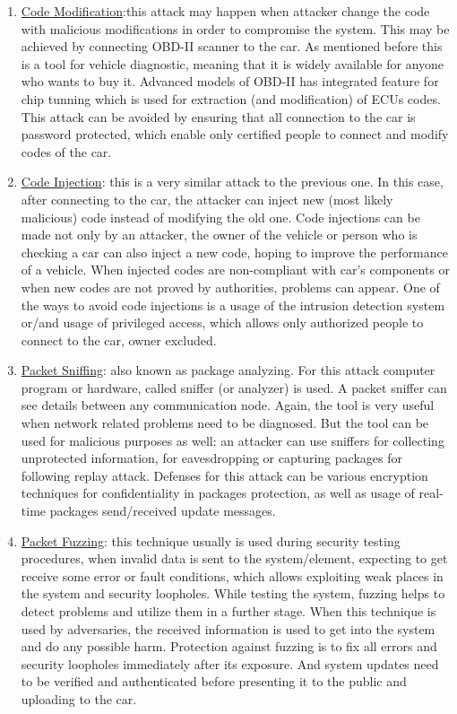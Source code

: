 \begin{itemize}
\begin{enumerate}
\begin{enumerate}
			\begin{enumerate}
				\item \underline{Code Modification}:this attack may happen when attacker change the code with malicious modifications in order to compromise the system. This may be achieved by connecting \gls{OBD-II} scanner to the car. As mentioned before this is a tool for vehicle diagnostic, meaning that it is widely available for anyone who wants to buy it. Advanced models of \gls{OBD-II} has integrated feature for chip tunning which is used for extraction (and modification) of \glspl{ECU} codes. This attack can be avoided by ensuring that all connection to the car is password protected, which enable only certified people to connect and modify codes of the car.
				\item \underline{Code Injection}: this is a very similar attack to the previous one. In this case, after connecting to the car, the attacker can inject new (most likely malicious) code instead of modifying the old one. Code injections can be made not only by an attacker, the owner of the vehicle or person who is checking a car can also inject a new code, hoping to improve the performance of a vehicle. When injected codes are non-compliant with car's components or when new codes are not proved by authorities, problems can appear. One of the ways to avoid code injections is a usage of the intrusion detection system or/and usage of privileged access, which allows only authorized people to connect to the car, owner excluded.
				\item \underline{Packet Sniffing}: also known as package analyzing. For this attack computer program or hardware, called sniffer (or analyzer) is used. A packet sniffer can see details between any communication node.  Again, the tool is very useful when network related problems need to be diagnosed. But the tool can be used for malicious purposes as well: an attacker can use sniffers for collecting unprotected information, for eavesdropping or capturing packages for following replay attack. Defenses for this attack can be various encryption techniques for confidentiality in packages protection, as well as usage of real-time packages send/received update messages.
				\item \underline{Packet Fuzzing}: this technique usually is used during security testing procedures, when invalid data is sent to the system/element, expecting to get receive some error or fault conditions, which allows exploiting weak places in the system and security loopholes. While testing the system, fuzzing helps to detect problems and utilize them in a further stage. When this technique is used by adversaries, the received information is used to get into the system and do any possible harm. Protection against fuzzing is to fix all errors and security loopholes immediately after its exposure. And system updates need to be verified and authenticated before presenting it to the public and uploading to the car.

\end{enumerate}
\end{enumerate}
\end{enumerate}
\end{itemize}
